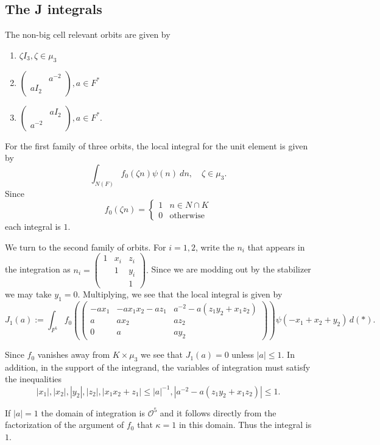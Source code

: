 \documentclass[12pt]{amsart}
\newcommand{\abs}[1]{\left|{#1}\right|}
\renewcommand{\O}{\mathcal{O}}
\theoremstyle{remark}
\begin{document}
\subsection{The J integrals}
The non-big cell relevant orbits are given by
\begin{enumerate}
\item $\zeta I_3, \zeta\in \mu_3$
\item $\begin{pmatrix} &   a^{-2}  \\ aI_2 &    \end{pmatrix}, a\in F^*$
\item $\begin{pmatrix}  & aI_2  \\ a^{-2}   & \end{pmatrix}, a\in F^*.$
\end{enumerate}

For the first family of three orbits, the local integral for the unit element is given by
$$\int_{N(F)} f_0(\zeta n)\psi(n)\ dn, \quad \zeta\in \mu_3.$$
Since
$$f_0(\zeta n)=\begin{cases} 1&n\in N\cap K\\0&\text{otherwise}\end{cases}$$
each integral is $1$.

We turn to the second family of orbits.  For $i=1,2$, write the $n_i$ that appears in the integration  as
$n_i=\left(\begin{smallmatrix}1&x_i&z_i\\&1&y_i\\&&1\end{smallmatrix}\right).$ Since we are modding out by the stabilizer we may take $y_1=0$. Multiplying, we see that the local integral is given by
$$J_1(a):=\int_{F^5} f_0\left(\begin{pmatrix}-ax_1&-ax_1x_2-az_1&a^{-2}-a(z_1y_2+x_1z_2)\\a&ax_2&az_2\\0&a&ay_2\end{pmatrix}\right)
\psi (-x_1+x_2+y_2)\,d(*).$$

Since $f_0$ vanishes away from $K\times \mu_3$ we see that $J_1(a)=0$ unless $|a|\leq1$.  In addition, in the support of the integrand,  the variables of integration must satisfy the inequalities
$$\abs{x_1},\abs{x_2},\abs{y_2},\abs{z_2}, \abs{x_1x_2+z_1}\leq |a|^{-1}, \abs{a^{-2}-a(z_1y_2+x_1z_2)}\leq1.$$

If $|a|=1$ the domain of integration is $\O^5$ and it follows directly from the factorization of the argument of $f_0$ that $\kappa=1$ in this domain.  Thus the integral is $1$.
\end{document}
